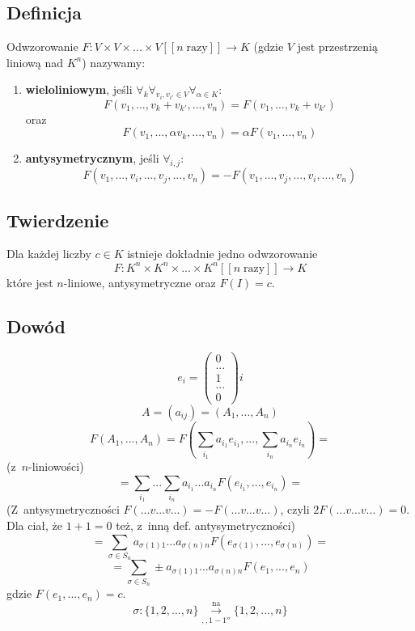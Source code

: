 \documentclass{article}
\begin{document}
  \subsection*{Definicja}
  Odwzorowanie
  $F: V \times V \times ... \times V [[n\; \mathrm{razy}]] \rightarrow K$
  (gdzie $V$ jest przestrzenią liniową nad $K^n$) nazywamy:
  \begin{enumerate}
    \item \textbf{wieloliniowym}, jeśli
      $\forall_k\forall_{v_i,v_{i'}\in V}\forall_{\alpha\in K}$:
      \[F(v_1, ..., v_k+v_{k'}, ..., v_n)
      = F(v_1, ..., v_k+v_{k'})\]
      oraz
      \[F(v_1, ..., \alpha v_k, ..., v_n) = \alpha F(v_1, ..., v_n)\]
    \item \textbf{antysymetrycznym}, jeśli $\forall_{i,j}$:
      \[F(v_1, ..., v_i, ..., v_j, ..., v_n)
      = -F(v_1, ..., v_j, ..., v_i, ..., v_n)\]
  \end{enumerate}

  \subsection*{Twierdzenie}
  Dla każdej liczby $c \in K$ istnieje dokładnie jedno odwzorowanie
  \[F: K^n \times K^n \times ... \times K^n [[n\; \mathrm{razy}]] \rightarrow K\]
  które jest $n$-liniowe, antysymetryczne oraz $F(I) = c$.

  \subsection*{Dowód}
  \[e_i=\begin{pmatrix}0\\...\\1\\...\\0\end{pmatrix}i\]
  \[A=(a_{ij})=(A_1, ..., A_n)\]
  \[F(A_1, ..., A_n) = F(\sum_{i_1}a_{i_1}e_{i_1}, ..., \sum_{i_n}a_{i_n}e_{i_n}) =\]
  (z~$n$-liniowości)
  \[= \sum_{i_1}...\sum_{i_n}a_{i_1}...a_{i_n}F(e_{i_1}, ..., e_{i_n}) =\]
  (Z~antysymetryczności $F(...v...v...)=-F(...v...v...)$,
  czyli $2F(...v...v...)=0$. Dla ciał, że $1+1=0$ też, z~inną def. antysymetryczności)
  \[= \sum_{\sigma\in S_n}a_{\sigma(1)1}...a_{\sigma(n)n}F(e_{\sigma(1)}, ..., e_{\sigma(n)}) = \]
  \[= \sum_{\sigma\in S_n} \pm a_{\sigma(1)1}...a_{\sigma(n)n}F(e_1, ..., e_n)\]
  gdzie $F(e_1, ..., e_n)=c$.
  \[\sigma: \{1, 2, ..., n\} \overset{\mathrm{na}}{\underset{\mathrm{,,1-1''}}{\longrightarrow}} \{1, 2, ..., n\}\]
\end{document}
